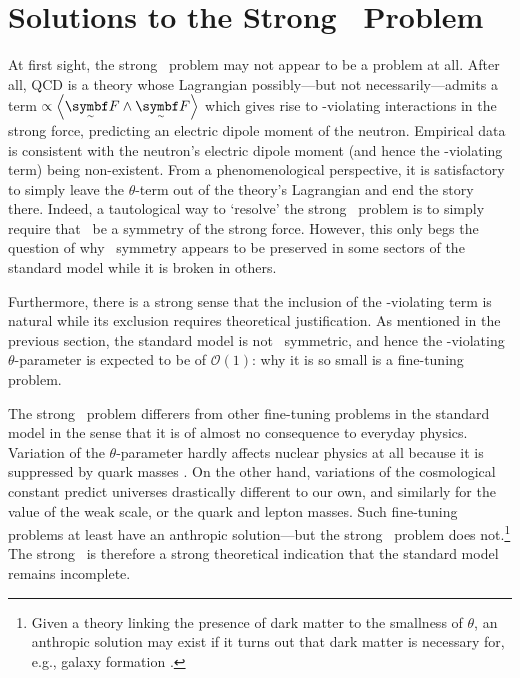\chapter{Solutions to the Strong \CP\ Problem}

At first sight, the strong \CP\ problem may not appear to be a problem at all.
After all, QCD is a theory whose Lagrangian possibly---but not necessarily---admits a term $\propto \angbr{\tsbm F \wedge \tsbm F}$ which gives rise to \CP-violating interactions in the strong force, predicting an electric dipole moment of the neutron.
Empirical data is consistent with the neutron's electric dipole moment (and hence the \CP-violating term) being non-existent.
From a phenomenological perspective, it is satisfactory to simply leave the $\theta$-term out of the theory's Lagrangian and end the story there.
Indeed, a tautological way to `resolve' the strong \CP\ problem is to simply require that \CP\ be a symmetry of the strong force.
However, this only begs the question of why \CP\ symmetry appears to be preserved in some sectors of the standard model while it is broken in others.

Furthermore, there is a strong sense that the inclusion of the \CP-violating term is natural while its exclusion requires theoretical justification.
As mentioned in the previous section, the standard model is not \CP\ symmetric, and hence the \CP-violating $\theta$-parameter is expected to be of $\mathcal{O}(1)$: why it is so small is a fine-tuning problem.

The strong \CP\ problem differers from other fine-tuning problems in the standard model  in the sense that it is of almost no consequence to everyday physics.
Variation of the $\theta$-parameter hardly affects nuclear physics at all because it is suppressed by quark masses \cite{Dine_2018}.
On the other hand, variations of the cosmological constant predict universes drastically different to our own, and similarly for the value of the weak scale, or the quark and lepton masses.
Such fine-tuning problems at least have an anthropic solution---but the strong \CP\ problem does not.\footnote{
	Given a theory linking the presence of dark matter to the smallness of $\theta$, an anthropic solution may exist if it turns out that dark matter is necessary for, e.g., galaxy formation \cite{Dine_2018}.
}
The strong \CP\ is therefore a strong theoretical indication that the standard model remains incomplete.



